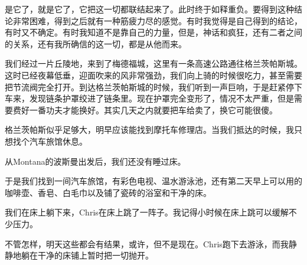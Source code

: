 \documentclass[UTF8]{article}
\begin{document}
\par 是它了，就是它了，它把这一切都联结起来了。此时终于如释重负。要得到这种结论非常困难，得到之后就有一种筋疲力尽的感觉。有时我觉得是自己得到的结论，有时又不确定。有时我知道不是靠自己的力量，但是，神话和疯狂，还有二者之间的关系，还有我所确信的这一切，都是从他而来。
\par 我们经过一片丘陵地，来到了梅德福城，这里有一条高速公路通往格兰茨帕斯城。这时已经夜幕低垂，迎面吹来的风非常强劲，我们向上骑的时候很吃力，甚至需要把节流阀完全打开。到达格兰茨帕斯城的时候，我们听到一声巨响，于是赶紧停下车来，发现链条护罩绞进了链条里。现在护罩完全变形了，情况不太严重，但是需要费好一番功夫才能换好。其实几天之内就要把车给卖了，换它可能很傻。
\par 格兰茨帕斯似乎足够大，明早应该能找到摩托车修理店。当我们抵达的时候，我只想找个汽车旅馆休息。
\par 从Montana的波斯曼出发后，我们还没有睡过床。
\par 于是我们找到一间汽车旅馆，有彩色电视、温水游泳池，还有第二天早上可以用的咖啡壶、香皂、白毛巾以及铺了瓷砖的浴室和干净的床。
\par 我们在床上躺下来，Chris在床上跳了一阵子。我记得小时候在床上跳可以缓解不少压力。
\par 不管怎样，明天这些都会有结果，或许，但不是现在。Chris跑下去游泳，而我静静地躺在干净的床铺上暂时把一切抛开。
\end{document}
